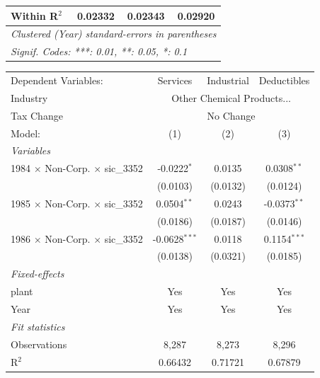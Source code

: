 \documentclass[
  12pt]{article}
\theoremstyle{definition}
\theoremstyle{remark}
\begin{document}
\begin{table}
\begin{minipage}{\linewidth}
\begin{tabular}{lccc}
   Within R$^2$                                  & 0.02332        & 0.02343         & 0.02920\\  
   \midrule \midrule
   \multicolumn{4}{l}{\emph{Clustered (Year) standard-errors in parentheses}}\\
   \multicolumn{4}{l}{\emph{Signif. Codes: ***: 0.01, **: 0.05, *: 0.1}}\\
\end{tabular}
\par\endgroup
\begingroup
\centering
\begin{tabular}{lccc}
   \tabularnewline \midrule \midrule
   Dependent Variables:                          & Services        & Industrial & Deductibles\\  
   Industry & \multicolumn{3}{c}{Other Chemical Products...} \\ 
   Tax Change & \multicolumn{3}{c}{No Change} \\ 
   Model:                                        & (1)             & (2)        & (3)\\  
   \midrule
   \emph{Variables}\\
   1984 $\times$ Non-Corp. $\times$ sic\_3352    & -0.0222$^{*}$   & 0.0135     & 0.0308$^{**}$\\   
                                                 & (0.0103)        & (0.0132)   & (0.0124)\\   
   1985 $\times$ Non-Corp. $\times$ sic\_3352    & 0.0504$^{**}$   & 0.0243     & -0.0373$^{**}$\\   
                                                 & (0.0186)        & (0.0187)   & (0.0146)\\   
   1986 $\times$ Non-Corp. $\times$ sic\_3352    & -0.0628$^{***}$ & 0.0118     & 0.1154$^{***}$\\   
                                                 & (0.0138)        & (0.0321)   & (0.0185)\\   
   \midrule
   \emph{Fixed-effects}\\
   plant                                         & Yes             & Yes        & Yes\\  
   Year                                          & Yes             & Yes        & Yes\\  
   \midrule
   \emph{Fit statistics}\\
   Observations                                  & 8,287           & 8,273      & 8,296\\  
   R$^2$                                         & 0.66432         & 0.71721    & 0.67879\\  

\end{tabular}
\end{minipage}
\end{table}
\end{document}
